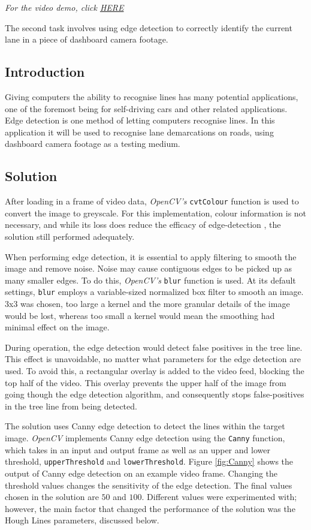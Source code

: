 \documentclass[conference]{IEEEtran}
\begin{document}
\textit{For the video demo, click \href{https://youtu.be/lRf7K6ZGJDk}{HERE}}

The second task involves using edge detection to correctly identify the current lane in a piece of dashboard camera footage. 
\subsection{Introduction}
Giving computers the ability to recognise lines has many potential applications, one of the foremost being for self-driving cars and other related applications. Edge detection is one method of letting computers recognise lines. In this application it will be used to recognise lane demarcations on roads, using dashboard camera footage as a testing medium.
\subsection{Solution}\label{2_solution}
After loading in a frame of video data, \textit{OpenCV's} \verb|cvtColour| function is used to convert the image to greyscale. For this implementation, colour information is not necessary, and while its loss does reduce the efficacy of edge-detection \cite{GreyVSColor}, the solution still performed adequately.  

When performing edge detection, it is essential to apply filtering to smooth the image and remove noise. Noise may cause contiguous edges to be picked up as many smaller edges.  To do this, \textit{OpenCV's} \verb|blur| function is used. At its default settings, \verb|blur| employs a variable-sized normalized box filter to smooth an image\cite{BlurDocs}. $3$x$3$ was chosen, too large a kernel and the more granular details of the image would be lost, whereas too small a kernel would mean the smoothing had minimal effect on the image.

During operation, the edge detection would detect false positives in the tree line. This effect is unavoidable, no matter what parameters for the edge detection are used. To avoid this, a rectangular overlay is added to the video feed, blocking the top half of the video. This overlay prevents the upper half of the image from going though the edge detection algorithm, and consequently stops false-positives in the tree line from being detected.

The solution uses Canny edge detection to detect the lines within the target image. \textit{OpenCV} implements Canny edge detection using the \verb|Canny| function\cite{8265710}, which takes in an input and output frame as well as an upper and lower threshold, \verb|upperThreshold| and \verb|lowerThreshold|. Figure \ref{fig:Canny} shows the output of Canny edge detection on an example video frame. Changing the threshold values changes the sensitivity of the edge detection. The final values chosen in the solution are $50$ and $100$. Different values were experimented with; however, the main factor that changed the performance of the solution was the Hough Lines parameters, discussed below. 
\end{document}
